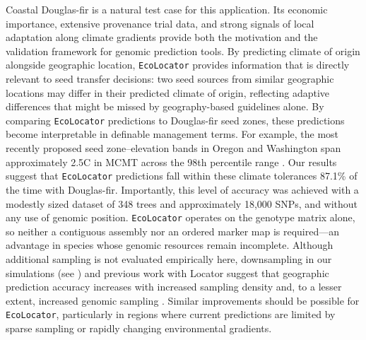 \documentclass[]{article}
\newcommand{\dfir}{Douglas-fir\xspace}
\newcommand{\ecolocator}{\texttt{EcoLocator}\xspace}
\begin{document}
Coastal \dfir is a natural test case for this application.
Its economic importance,
extensive provenance trial data,
and strong signals of local adaptation along climate gradients
provide both the motivation and the validation framework
for genomic prediction tools.
By predicting climate of origin alongside geographic location,
\ecolocator provides information that is directly relevant
to seed transfer decisions:
two seed sources from similar geographic locations may differ
in their predicted climate of origin,
reflecting adaptive differences that might be missed
by geography-based guidelines alone.
By comparing \ecolocator predictions to \dfir seed zones,
these predictions become interpretable in definable management terms.
For example,
the most recently proposed seed zone--elevation bands
in Oregon and Washington span approximately
2.5\textdegree C in MCMT across the 98th percentile range \citep{shalev_zone_2026}.
Our results suggest that \ecolocator predictions fall
within these climate tolerances 87.1\% of the time with \dfir. 
Importantly,
this level of accuracy was achieved with a modestly sized dataset
of 348 trees and approximately 18,000 SNPs,
and without any use of genomic position.
\ecolocator operates on the genotype matrix alone,
so neither a contiguous assembly nor an ordered marker map is required---an
advantage in species whose genomic resources remain incomplete.
Although additional sampling is not evaluated empirically here, downsampling in
our simulations (see ) and
previous work with Locator suggest that geographic prediction accuracy
increases with increased sampling density and,
to a lesser extent,
increased genomic sampling \citep{battey_predicting_2020}.
Similar improvements should be possible for \ecolocator,
particularly in regions where current predictions are limited
by sparse sampling or rapidly changing environmental gradients.
\end{document}

